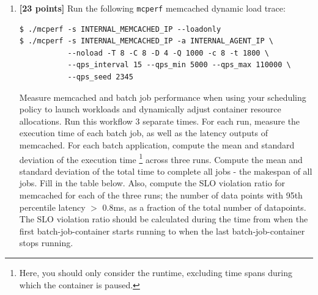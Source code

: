 \begin{enumerate}
\begin{itemize}
\textbf{Answer:} %
The polling interval length trades responsiveness for measurement noise; shorter intervals produce noisy readings and oscillation, longer intervals risk missing load spikes.

Asymmetric thresholds ($>80\%$/$90\%$ scale up, $<70\%$ scale down) prevent hysteresis. The tradeoff is between stability and optimal utilization.

Pre-creating containers eliminates Docker image pull and creation latency from the critical path.

Pinning the controller to a core other than core 0, which always belongs to memcached, ensures, that memcached tends to run uninterfered.
\\
\end{itemize}

\item \textbf{[23 points]} Run the following \texttt{mcperf} memcached dynamic load trace: 
    
\begin{Verbatim}[fontsize=\small]
$ ./mcperf -s INTERNAL_MEMCACHED_IP --loadonly 
$ ./mcperf -s INTERNAL_MEMCACHED_IP -a INTERNAL_AGENT_IP \ 
           --noload -T 8 -C 8 -D 4 -Q 1000 -c 8 -t 1800 \ 
           --qps_interval 15 --qps_min 5000 --qps_max 110000 \ 
           --qps_seed 2345
\end{Verbatim}
    
    
    Measure memcached and batch job performance when using your scheduling policy to launch workloads and dynamically adjust container resource allocations. Run this workflow 3 separate times. For each run, measure the execution time of each batch job, as well as the latency outputs of memcached. For each batch application, compute the mean and standard deviation of the execution time \footnote{Here, you should only consider the runtime, excluding time spans during which the container is paused.} across three runs. Compute the mean and standard deviation of the total time to complete all jobs - the makespan of all jobs. Fill in the table below.  Also, compute the SLO violation ratio for memcached for each of the three runs; the number of data points with 95th percentile latency $>$ 0.8ms, as a fraction of the total number of datapoints. The SLO violation ratio should be calculated during the time from when the first batch-job-container starts running to when the last batch-job-container stops running. \\
    

\end{enumerate}

